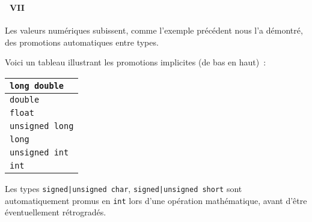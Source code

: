 \begin{frame}[containsverbatim]
  \frametitle{\secname}
  \framesubtitle{\subsecname~VII} 
  
  Les valeurs numériques subissent, comme l'exemple précédent nous l'a démontré, des promotions automatiques entre types.
  \vspace{0.5cm}
  \par
  Voici un tableau illustrant les promotions implicites (de bas en haut)~:
  \begin{tabular}{|m{10cm}|}
    \hline
    \verb|long double| \\
    \hline
    \verb|double| \\
    \hline
    \verb|float| \\
    \hline
    \verb|unsigned long| \\
    \hline
    \verb|long| \\
    \hline
    \verb|unsigned int| \\
    \hline
    \verb|int| \\
    \hline
  \end{tabular}
  \vspace{0.5cm}
  \par
  Les types \verb#signed|unsigned char#, \verb#signed|unsigned short# sont automatiquement promus en \verb|int| lors d'une opération mathématique,
  avant d'être éventuellement rétrogradés.
\end{frame}

